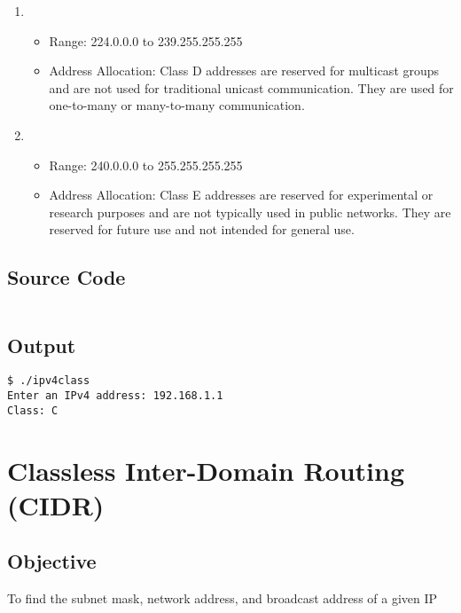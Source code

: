 \documentclass{korigamik}
\begin{document}
\begin{enumerate}[label=\textbf{Class \Alph*:}, leftmargin=2cm]
	\item \begin{itemize}
		      \item Range: 224.0.0.0 to 239.255.255.255
		      \item Address Allocation: Class D addresses are reserved for
		            multicast groups and are not used for traditional unicast
		            communication. They are used for one-to-many or many-to-many
		            communication.
	      \end{itemize}

	\item \begin{itemize}
		      \item Range: 240.0.0.0 to 255.255.255.255
		      \item Address Allocation: Class E addresses are reserved for
		            experimental or research purposes and are not typically used in
		            public networks. They are reserved for future use and not intended
		            for general use.
	      \end{itemize}
\end{enumerate}


\subsection{Source Code}

\inputminted[firstline=5, lastline=25, fontsize=\footnotesize]{cpp}{code/ipv4class.cpp}

\subsection{Output}

\begin{lstlisting}[style=output]
$ ./ipv4class
Enter an IPv4 address: 192.168.1.1
Class: C
\end{lstlisting}

\pagebreak

\section{Classless Inter-Domain Routing (CIDR)}
\label{sec:cidr}

\subsection{Objective}
To find the subnet mask, network address, and broadcast address of a given IP
\end{document}
